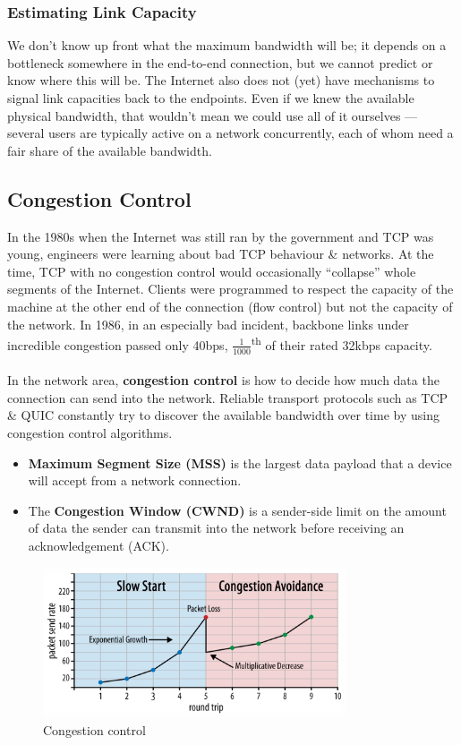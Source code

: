 \documentclass[a4paper,11pt]{article}
\begin{document}
\subsubsection{Estimating Link Capacity}
We don't know up front what the maximum bandwidth will be;
it depends on a bottleneck somewhere in the end-to-end connection, but we cannot predict or know where this will be.
The Internet also does not (yet) have mechanisms to signal link capacities back to the endpoints.
Even if we knew the available physical bandwidth, that wouldn't mean we could use all of it ourselves --- several users are typically active on a network concurrently, each of whom need a fair share of the available bandwidth.

\subsection{Congestion Control}
In the 1980s when the Internet was still ran by the government and TCP was young, engineers were learning about bad TCP behaviour \& networks.
At the time, TCP with no congestion control would occasionally ``collapse'' whole segments of the Internet.
Clients were programmed to respect the capacity of the machine at the other end of the connection (flow control) but not the capacity of the network.
In 1986, in an especially bad incident, backbone links under incredible congestion passed only 40bps, $\frac{1}{1000}$\textsuperscript{th} of their rated 32kbps capacity.
\\\\
In the network area, \textbf{congestion control} is how to decide how much data the connection can send into the network.
Reliable transport protocols such as TCP \& QUIC constantly try to discover the available bandwidth over time by using congestion control algorithms.
\begin{itemize}
    \item   \textbf{Maximum Segment Size (MSS)} is the largest data payload that a device will accept from a network connection.
    \item   The \textbf{Congestion Window (CWND)} is a sender-side limit on the amount of data the sender can transmit into the network before receiving an acknowledgement (ACK).
\end{itemize}

\begin{figure}[H]
    \centering
    \includegraphics[width=0.8\textwidth]{./images/congestionctrl.png}
    \caption{Congestion control}
\end{figure}
\end{document}
